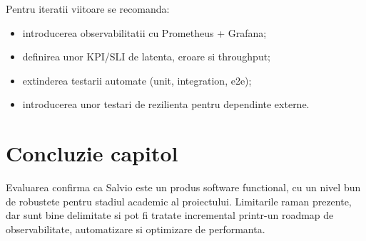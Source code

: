 Pentru iteratii viitoare se recomanda:
\begin{itemize}[leftmargin=1.2cm]
    \item introducerea observabilitatii cu Prometheus + Grafana;
    \item definirea unor KPI/SLI de latenta, eroare si throughput;
    \item extinderea testarii automate (unit, integration, e2e);
    \item introducerea unor testari de rezilienta pentru dependinte externe.
\end{itemize}

\section{Concluzie capitol}

Evaluarea confirma ca Salvio este un produs software functional, cu un nivel bun de robustete pentru stadiul academic al proiectului. Limitarile raman prezente, dar sunt bine delimitate si pot fi tratate incremental printr-un roadmap de observabilitate, automatizare si optimizare de performanta.
